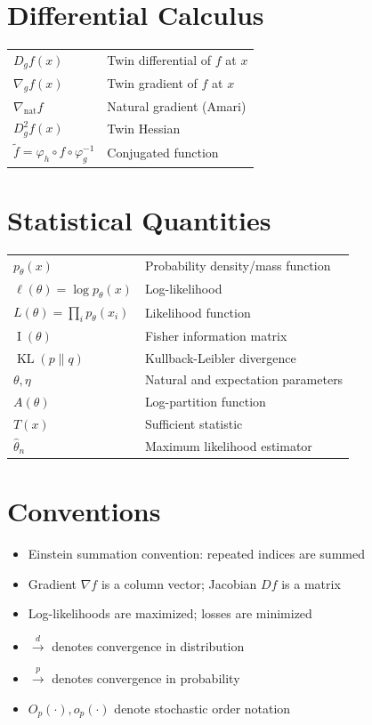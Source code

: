 \documentclass[11pt,twoside]{book}
\theoremstyle{plain}
\theoremstyle{definition}
\theoremstyle{remark}
\DeclareMathOperator{\KL}{KL}
\DeclareMathOperator{\Fisher}{I}
\newcommand{\Dg}{D_g}
\newcommand{\nablg}{\nabla_g}
\newcommand{\nabnat}{\nabla_{\mathrm{nat}}}
\begin{document}
\section*{Differential Calculus}

\begin{tabular}{ll}
    $\Dg f(x)$ & Twin differential of $f$ at $x$ \\
    $\nablg f(x)$ & Twin gradient of $f$ at $x$ \\
    $\nabnat f$ & Natural gradient (Amari) \\
    $D^2_g f(x)$ & Twin Hessian \\
    $\tilde{f} = \varphi_h \circ f \circ \varphi_g^{-1}$ & Conjugated function \\
\end{tabular}

\section*{Statistical Quantities}

\begin{tabular}{ll}
    $p_\theta(x)$ & Probability density/mass function \\
    $\ell(\theta) = \log p_\theta(x)$ & Log-likelihood \\
    $L(\theta) = \prod_i p_\theta(x_i)$ & Likelihood function \\
    $\Fisher(\theta)$ & Fisher information matrix \\
    $\KL(p \| q)$ & Kullback-Leibler divergence \\
    $\theta, \eta$ & Natural and expectation parameters \\
    $A(\theta)$ & Log-partition function \\
    $T(x)$ & Sufficient statistic \\
    $\hat{\theta}_n$ & Maximum likelihood estimator \\
\end{tabular}

\section*{Conventions}

\begin{itemize}
    \item Einstein summation convention: repeated indices are summed
    \item Gradient $\nabla f$ is a column vector; Jacobian $Df$ is a matrix
    \item Log-likelihoods are maximized; losses are minimized
    \item $\stackrel{d}{\to}$ denotes convergence in distribution
    \item $\stackrel{p}{\to}$ denotes convergence in probability
    \item $O_p(\cdot), o_p(\cdot)$ denote stochastic order notation
\end{itemize}
\end{document}
